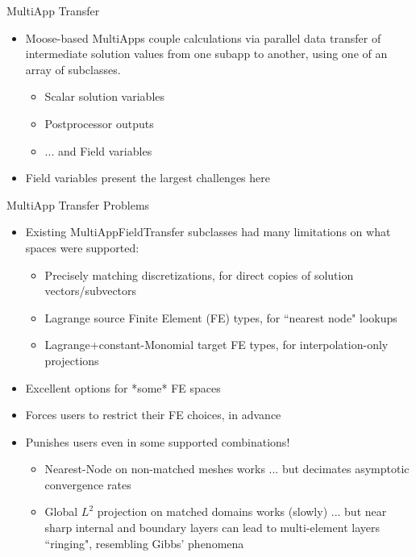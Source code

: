 %
%


\begin{frame}{MultiApp Transfer}
\begin{itemize}
  \item Moose-based MultiApps couple calculations via parallel data
    transfer of intermediate solution values from one subapp to
    another, using one of an array of 
    subclasses.
  \begin{itemize}
    \item Scalar solution variables
    \item Postprocessor outputs
    \item ... and Field variables
  \end{itemize}
\end{itemize}

\vfill

\begin{itemize}
  \item Field variables present the largest challenges here
\end{itemize}
\end{frame}


\begin{frame}{MultiApp Transfer Problems}
\begin{itemize}
  \item Existing MultiAppFieldTransfer subclasses had many limitations
    on what spaces were supported:
  \begin{itemize}
    \item Precisely matching discretizations, for direct copies of
      solution vectors/subvectors
    \item Lagrange source Finite Element (FE) types, for ``nearest node" lookups
    \item Lagrange+constant-Monomial target FE types, for interpolation-only projections
  \end{itemize}
\end{itemize}

\vfill

\begin{itemize}
  \item Excellent options for *some* FE spaces
  \item Forces users to restrict their FE choices, in advance
  \item Punishes users even in some supported combinations!
  \begin{itemize}
    \item Nearest-Node on non-matched meshes works ... but decimates
      asymptotic convergence rates
    \item Global $L^2$ projection on matched domains works (slowly) ... but
      near sharp internal and boundary layers can lead to
      multi-element layers ``ringing", resembling Gibbs' phenomena
  \end{itemize}
\end{itemize}
\end{frame}


